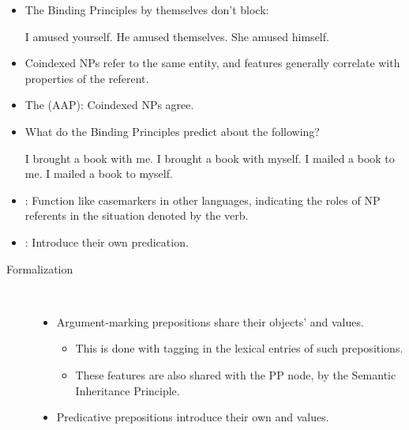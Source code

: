 \documentclass[a4paper,landscape,headrule,footrule]{foils}
\begin{document}
\begin{itemize}
\item The Binding Principles by themselves don’t block:
  \begin{exe}
    \ix * I amused yourself.
    \ix * He amused themselves.
    \ix * She amused himself.
  \end{exe}
\item Coindexed NPs refer to the same entity, and  features
generally correlate with properties of the referent.
\item The  (AAP):
Coindexed NPs agree.
\end{itemize}

\begin{itemize}
\item What do the Binding Principles predict about the
following?
  \begin{exe}
    \ix I brought a book with me.
    \ix *I brought a book with myself.
    \ix *I mailed a book to me.
    \ix I mailed a book to myself.
  \end{exe}
\end{itemize}

\begin{itemize}
\item {}: Function like casemarkers in other languages, indicating the
roles of NP referents in the situation denoted by the verb.
\item {}: Introduce their own predication.
\end{itemize}

\begin{description}
\item [Formalization] ~\\[-2ex]
  \begin{itemize}
  \item Argument-marking prepositions share their
    objects'  and  values.
    \begin{itemize}
    \item This is done with tagging in the lexical
      entries of such prepositions.
    \item These features are also shared with the PP
      node, by the Semantic Inheritance Principle.
    \end{itemize}
  \item Predicative prepositions introduce their own
 and  values.
\end{itemize}
\end{description}
\end{document}
